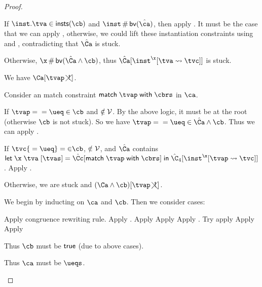 \documentclass[acmsmall,screen,nonacm,review]{acmart}
\begin{document}
\begin{proof}
\begin{proofcases}
\begin{proofcases}
\begin{proofcases}
	    If $\inst.\tv \in \insts \cb$ and $\inst \disjoint \bvs {\hat\ca}$, then apply .
	    It must be the case that we can apply , otherwise, we could lift these instantiation
	    constraints using  and , contradicting that $\hat\Ca$ is stuck.

	    Otherwise, $\x \disjoint \bvs {\hat \Ca \cand \cb}$, thus $\hat\Ca\where{\cpapp \x \tv \tvc \inst}$ is stuck.

	  \proofcase{$\hat\Ca\where{\cmatch \tvp \cbrs}$}
	    We have $\nCshape \Ca \tvp$.

	    Consider an match constraint $\cmatch \tvp \cbrs$ in $\ca$.

	    If $\cunif \tvp {\cunif \t \ueq} \in \cb$ and $\relax \notin \mathcal{V}$. By the above logic, it must be at the root (otherwise $\cb$
	    is not stuck). So we have $\cunif \tvp {\cunif \t \ueq} \in \hat \Ca \cand \cb$. Thus we can apply .

	    If $\cunif \tvc {\cunif \t \ueq} \in \cb$, $\relax \notin \mathcal{V}$, and $\hat\Ca$ contains $\cletr \x \tv \tvs {\hat\Cc\where{\cmatch \tvp \cbrs}} {\hat\C_4\where{\cpapp \x \tvp \tvc \inst}}$.
	    Apply .

	    Otherwise, we are stuck and $\nCshape {(\Ca \cand \cb)} \tvp$.
	\end{proofcases}

    \end{proofcases}

    \proofcase{$\cletr \x \tv \tvs \ca \cb$}
    We begin by inducting on $\ca$ and $\cb$. Then we consider cases:
    \begin{proofcases}
       Apply congruence rewriting rule.
       Apply .
       Apply 
       Apply 
       Apply .
       Try apply 
       Apply 
       Apply 

	Thus $\cb$ must be $\mathsf{true}$ (due to above cases).
	\begin{proofcases}
	    Thus $\ca$ must be $\ueqs$.


\end{proofcases}
\end{proofcases}
\end{proofcases}
\end{proof}
\end{document}
